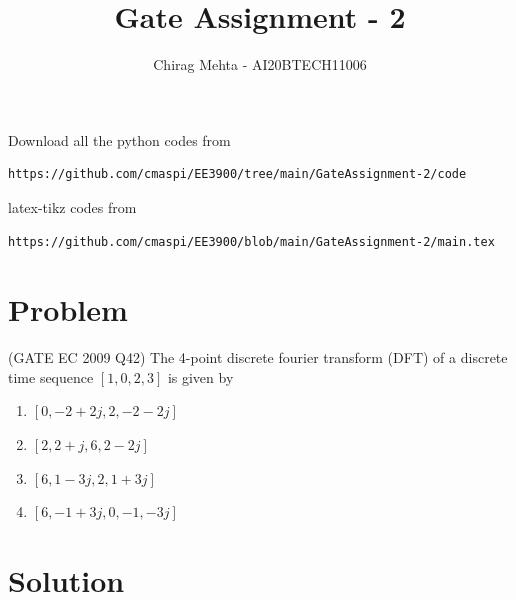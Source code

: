 \documentclass[journal,12pt,twocolumn]{IEEEtran}
\begin{document}
\makeatletter
{}
\makeatother
\let\StandardTheFigure\thefigure
\let\vec\mathbf
\renewcommand{\thefigure}{\theproblem}
\def\putbox#1#2#3{\makebox[0in][l]{\makebox[#1][l]{}\raisebox{\baselineskip}[0in][0in]{\raisebox{#2}[0in][0in]{#3}}}}
     \def\rightbox#1{\makebox[0in][r]{#1}}
     \def\centbox#1{\makebox[0in]{#1}}
     \def\topbox#1{\raisebox{-\baselineskip}[0in][0in]{#1}}
     \def\midbox#1{\raisebox{-0.5\baselineskip}[0in][0in]{#1}}
\vspace{3cm}
\title{Gate Assignment - 2}
\author{Chirag Mehta - AI20BTECH11006}
\maketitle
\newpage
\bigskip
\renewcommand{\thefigure}{\theenumi}
\renewcommand{\thetable}{\theenumi}
Download all the python codes from
\begin{lstlisting}
https://github.com/cmaspi/EE3900/tree/main/GateAssignment-2/code
\end{lstlisting}
latex-tikz codes from 
\begin{lstlisting}
https://github.com/cmaspi/EE3900/blob/main/GateAssignment-2/main.tex
\end{lstlisting}
\section{Problem}
(GATE EC 2009 Q42)
The 4-point discrete fourier transform (DFT) of a discrete time sequence $[1,0,2,3]$ is given by
\begin{enumerate}
    \item $[0,-2+2j,2,-2-2j]$
    \item $[2,2+j,6,2-2j]$
    \item $[6,1-3j,2,1+3j]$
    \item $[6,-1+3j,0,-1,-3j]$
\end{enumerate}
\section{Solution}
\end{document}
